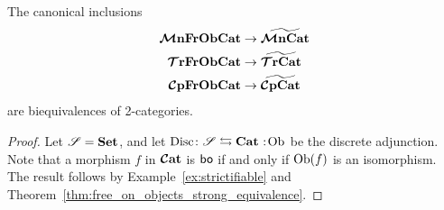 \documentclass[11pt,oneside,article]{memoir}
\begin{document}
\begin{corollary}
      \label{cor:object_frees}
   The canonical inclusions
   \begin{align*}
      \bm{\mathcal{M}}\mathbf{nFrObCat} &\to \widetilde{\bm{\mathcal{M}}\mathbf{nCat}} \\
      \bm{\mathcal{T}}\mathbf{rFrObCat} &\to \widetilde{\bm{\mathcal{T}}\mathbf{rCat}} \\
      \bm{\mathcal{C}}\mathbf{pFrObCat} &\to \widetilde{\bm{\mathcal{C}}\mathbf{pCat}}
   \end{align*}
   are biequivalences of 2-categories.
\end{corollary}
\begin{proof}
   Let $\mathscr{S}=\mathbf{Set}$, and let $\Disc\colon\cat{S}\leftrightarrows\Cat\cocolon\Ob$ be the discrete
   adjunction. Note that a morphism $f$ in $\bm{\mathcal{C}}\mathbf{at}$ is $\mathsf{bo}$ if and only if $\mathrm{Ob}(f)$ is an
   isomorphism. The result follows by Example~\ref{ex:strictifiable} and
   Theorem~\ref{thm:free_on_objects_strong_equivalence}.
\end{proof}
\end{document}
